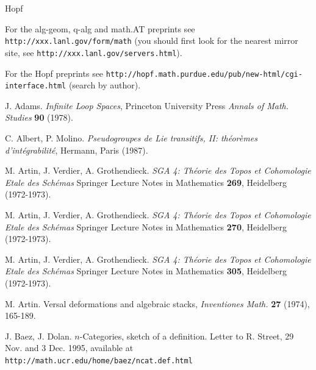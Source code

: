 
\begin{thebibliography}{Hopf}
\label{references}

For the alg-geom, q-alg and math.AT preprints see
\newline
{\tt http://xxx.lanl.gov/form/math}
\newline (you should first look for the nearest mirror site, see \newline
{\tt http://xxx.lanl.gov/servers.html}).

For the Hopf preprints see \newline
{\tt http://hopf.math.purdue.edu/pub/new-html/cgi-interface.html}
\newline
(search by author).

J. Adams. {\em Infinite Loop Spaces}, Princeton University Press {\em Annals
of Math. Studies} {\bf 90} (1978).

C. Albert, P. Molino. {\em Pseudogroupes de Lie transitifs, II:
th\'eor\`emes d'int\'egrabilit\'e}, Hermann, Paris (1987).

M. Artin, J. Verdier, A. Grothendieck. {\em SGA 4: Th\'eorie des Topos et
Cohomologie Etale des Sch\'emas} Springer Lecture Notes in Mathematics {\bf
269},  Heidelberg (1972-1973).

M. Artin, J. Verdier, A. Grothendieck. {\em SGA 4: Th\'eorie des Topos et
Cohomologie Etale des Sch\'emas} Springer Lecture Notes in Mathematics
{\bf 270},  Heidelberg (1972-1973).

M. Artin, J. Verdier, A. Grothendieck. {\em SGA 4: Th\'eorie des Topos et
Cohomologie Etale des Sch\'emas} Springer Lecture Notes in Mathematics {\bf
305}, Heidelberg
(1972-1973).

M. Artin.  Versal deformations and algebraic stacks, {\em Inventiones Math.}
{\bf 27} (1974), 165-189.

J. Baez, J. Dolan. $n$-Categories, sketch of a
definition. Letter to R. Street, 29 Nov. and 3 Dec. 1995, available at
{\tt http://math.ucr.edu/home/baez/ncat.def.html}


\end{thebibliography}
